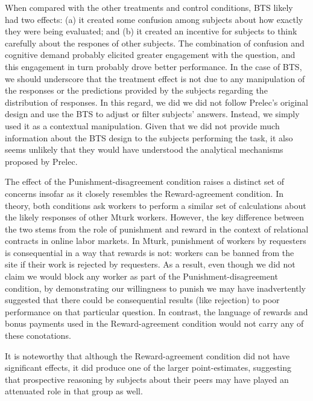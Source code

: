 \documentclass{cscw2010}
\begin{document}
When compared with the other treatments and control conditions, BTS
likely had two effects: (a) it created some confusion among subjects
about how exactly they were being evaluated; and (b) it created an
incentive for subjects to think carefully about the respones of other
subjects. The combination of confusion and cognitive demand probably
elicited greater engagement with the question, and this engagement in
turn probably drove better performance. In the case of BTS, we should
underscore that the treatment effect is not due to any manipulation of
the responses or the predictions provided by the subjects regarding the
distribution of responses. In this regard, we did we did not follow
Prelec's original design and use the BTS to adjust or filter subjects'
answers.\cite{prelec_bts_2004} Instead, we simply used it as a
contextual manipulation. Given that we did not provide much
information about the BTS design to the subjects performing the task,
it also seems unlikely that they would have understood the analytical
mechanisms proposed by Prelec.

The effect of the Punishment-disagreement condition raises a distinct
set of concerns insofar as it closely resembles the Reward-agreement
condition. In theory, both conditions ask workers to perform a similar
set of calculations about the likely responses of other Mturk
workers. However, the key difference between the two stems from the
role of punishment and reward in the context of relational contracts in
online labor markets. In Mturk, punishment of workers by requesters is
consequential in a way that rewards is not: workers can be banned from
the site if their work is rejected by requesters. As a result, even
though we did not claim we would block any worker as part of the
Punishment-disagreement condition, by demonstrating our willingness to punish 
we may have inadvertently suggested that there could be
consequential results (like rejection) to poor performance on that particular
question. In contrast, the language of rewards and bonus payments used
in the Reward-agreement condition would not carry any of these
conotations.
 
It is noteworthy that although the Reward-agreement condition did not
have significant effects, it did produce one of the larger
point-estimates, suggesting that prospective reasoning by
subjects about their peers may have played an attenuated role in that
group as well.
\end{document}
